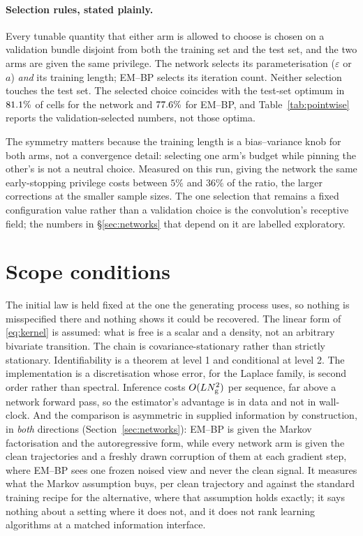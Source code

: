 \paragraph{Selection rules, stated plainly.} Every tunable quantity that either arm is allowed to
choose is chosen on a validation bundle disjoint from both the training set and the test set, and
the two arms are given the same privilege. The network selects its parameterisation
($\varepsilon$ or $a$) \emph{and} its training length; EM--BP selects its iteration count. Neither
selection touches the test set. The selected choice coincides with the test-set optimum in
$81.1\%$ of cells for the network and $77.6\%$ for EM--BP, and Table~\ref{tab:pointwise}
reports the validation-selected numbers, not those optima.

The symmetry matters because the training length is a bias--variance knob for both arms, not a
convergence detail: selecting one arm's budget while pinning the other's is not a neutral choice.
Measured on this run, giving the network the same early-stopping privilege costs between $5\%$ and
$36\%$ of the ratio, the larger corrections at the smaller sample sizes. The one selection that
remains a fixed configuration value rather than a validation choice is the convolution's receptive
field; the numbers in \S\ref{sec:networks} that depend on it are labelled exploratory.

\section{Scope conditions}
\label{app:limits}

The initial law is held fixed at the one the generating process uses, so nothing is misspecified
there and nothing shows it could be recovered. The linear form of \eqref{eq:kernel} is assumed:
what is free is a scalar and a density, not an arbitrary bivariate transition. The chain is
covariance-stationary rather than strictly stationary. Identifiability is a theorem at level 1 and
conditional at level 2. The implementation is a discretisation whose error, for the Laplace family,
is second order rather than spectral. Inference costs $O(LN_{\mathrm{g}}^{2})$ per sequence, far above
a network forward pass, so the estimator's advantage is in data and not in wall-clock. And the
comparison is asymmetric in supplied information by construction, in \emph{both} directions
(Section~\ref{sec:networks}): EM--BP is given the Markov factorisation and the autoregressive
form, while every network arm is given the clean trajectories and a freshly drawn corruption of
them at each gradient step, where EM--BP sees one frozen noised view and never the clean signal.
It measures what the Markov assumption buys, per clean trajectory and against the standard
training recipe for the alternative, where that assumption holds exactly; it says nothing about a
setting where it does not, and it does not rank learning algorithms at a matched information
interface.

